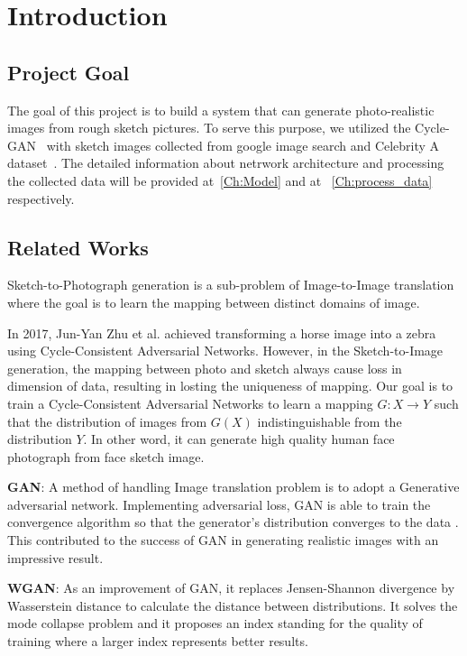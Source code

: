 \chapter{Introduction}\label{Ch:Introduction}

\section{Project Goal}

The goal of this project is to build a system that can generate photo-realistic images from rough sketch pictures. To serve this purpose, we utilized the Cycle-GAN~\cite{CycleGAN} with sketch images collected from google image search and Celebrity A dataset~\cite{liu2015faceattributes}. The detailed information about netrwork architecture and processing the collected data will be provided at~\ref{Ch:Model} and at ~\ref{Ch:process_data} respectively.


\section{Related Works}

Sketch-to-Photograph generation is a sub-problem of Image-to-Image translation where the goal is to learn the mapping between distinct domains of image.

In 2017, Jun-Yan Zhu et al. achieved transforming a horse image into a zebra using Cycle-Consistent Adversarial Networks. However, in the Sketch-to-Image generation, the mapping between photo and sketch always cause loss in dimension of data, resulting in losting the uniqueness of mapping. Our goal is to train a Cycle-Consistent Adversarial Networks to learn a mapping \(G:X \rightarrow Y\) such that the distribution of images from \(G(X)\) indistinguishable from the distribution \(Y\). In other word, it can generate high quality human face photograph from face sketch image.

\textbf{GAN}: A method of handling Image translation problem is to adopt a Generative adversarial network. Implementing adversarial loss, GAN is able to train the convergence algorithm so that the generator's distribution converges to the data\cite{GANs0} . This contributed to the success of GAN in generating realistic images with an impressive result.

\textbf{WGAN}: As an improvement of GAN, it replaces Jensen-Shannon divergence by Wasserstein distance to calculate the distance between distributions. It solves the mode collapse problem and it proposes an index standing for the quality of training where a larger index represents better results.

